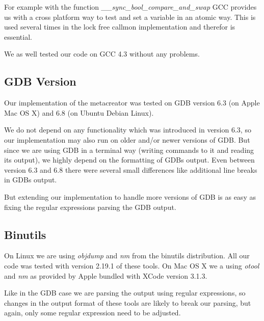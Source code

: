 For example with the function \emph{\_\_sync\_bool\_compare\_and\_swap} GCC provides us with a cross platform way to test and set a variable in an atomic way. This is used several times in the lock free callmon implementation and therefor is essential.

We as well tested our code on GCC 4.3 without any problems.

\subsection{GDB Version} Our implementation of the metacreator was tested on GDB version 6.3 (on Apple Mac OS X) and 6.8 (on Ubuntu Debian Linux).

We do not depend on any functionality which was introduced in version 6.3, so our implementation may also run on older and/or newer versions of GDB. But since we are using GDB in a terminal way (writing commands to it and reading its output), we highly depend on the formatting of GDBs output. Even between version 6.3 and 6.8 there were several small differences like additional line breaks in GDBs output.

But extending our implementation to handle more versions of GDB is as easy as fixing the regular expressions parsing the GDB output.

\subsection{Binutils} On Linux we are using \emph{objdump} and \emph{nm} from the binutils distribution. All our code was tested with version 2.19.1 of these tools. On Mac OS X we a using \emph{otool} and \emph{nm} as provided by Apple bundled with XCode version 3.1.3.

Like in the GDB case we are parsing the output using regular expressions, so changes in the output format of these tools are likely to break our parsing, but again, only some regular expression need to be adjusted.
